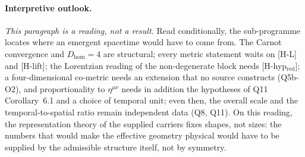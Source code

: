 \documentclass[11pt,a4paper]{article}
\theoremstyle{definition}
\newcommand{\Dhom}{D_{\mathrm{hom}}}
\begin{document}
    \paragraph{Interpretive outlook.}
    \emph{This paragraph is a reading, not a result.}
    Read conditionally, the sub-programme locates where an emergent spacetime would have to come
    from.
    The Carnot convergence and $\Dhom = 4$ are structural; every metric statement waits on
    [H-L] and [H-lift]; the Lorentzian reading of the non-degenerate block needs
    [H-hyp$_{\mathrm{red}}$]; a four-dimensional co-metric needs an extension that no source constructs
    (Q5b-O2), and proportionality to $\eta^{\mu\nu}$ needs in addition the hypotheses of Q11
    Corollary~6.1 and a choice of temporal unit; even then, the overall scale and the temporal-to-spatial
    ratio remain independent data (Q8, Q11).
    On this reading, the representation theory of the supplied carriers fixes shapes, not
    sizes: the numbers that would make the effective geometry physical would have to be supplied
    by the admissible structure itself, not by symmetry.

    \newpage
    
    
\end{document}
